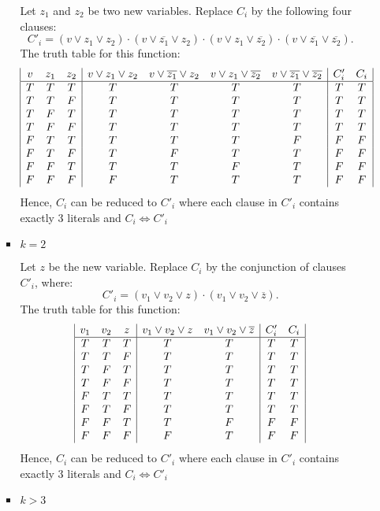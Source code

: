 \documentclass{homework}
\begin{document}
\begin{enumerate}[label=(\alph*)]
\begin{enumerate}[label = \arabic*.]
\begin{itemize}
		Let $z_1$ and $z_2$ be two new variables. Replace $C_i$ by the following four clauses:
		\[C'_i = (v\lor z_1\lor z_2)\cdot(v\lor \overline{z_1}\lor z_2)\cdot(v\lor z_1\lor \overline{z_2})\cdot(v\lor \overline{z_1}\lor \overline{z_2}). \]
		The truth table for this function:
		\begin{displaymath}
		\begin{array}{|c c c|c c c c|c c|}
		v & z_1 & z_2 & v\lor z_1\lor z_2 & v\lor \overline{z_1}\lor z_2 & v\lor z_1\lor \overline{z_2} &v\lor \overline{z_1}\lor \overline{z_2} & C'_i & C_i \\
		\hline
		T & T & T & T & T & T & T & T & T\\
		T & T & F & T & T & T & T & T & T\\
		T & F & T & T & T & T & T & T & T\\
		T & F & F & T & T & T & T & T & T\\
		F & T & T & T & T & T & F & F & F\\
		F & T & F & T & F & T & T & F & F\\
		F & F & T & T & T & F & T & F & F\\
		F & F & F & F & T & T & T & F & F\\
		\end{array}
		\end{displaymath}
		Hence, $C_i$ can be reduced to $C'_i$ where each clause in $C'_i$ contains exactly 3 literals and $C_i \Longleftrightarrow C'_i$
		\item $k=2$

		Let $z$ be the new variable. Replace $C_i$ by the conjunction of clauses $C'_i$, where: \[C'_i = (v_1\lor v_2\lor z)\cdot(v_1\lor v_2\lor \overline{z}).\]
		The truth table for this function:
		\begin{displaymath}
		\begin{array}{|c c c|c c|c c|}
		v_1 & v_2 & z & v_1\lor v_2\lor z & v_1\lor v_2\lor \overline{z} &  C'_i & C_i \\
		\hline
		T & T & T & T & T & T & T\\
		T & T & F & T & T & T & T\\
		T & F & T & T & T & T & T\\
		T & F & F & T & T & T & T\\
		F & T & T & T & T & T & T\\
		F & T & F & T & T & T & T\\
		F & F & T & T & F & F & F\\
		F & F & F & F & T & F & F\\
		\end{array}
		\end{displaymath}
		Hence, $C_i$ can be reduced to $C'_i$ where each clause in $C'_i$ contains exactly 3 literals and $C_i \Longleftrightarrow C'_i$
		\item $k>3$
		

\end{itemize}
\end{enumerate}
\end{enumerate}
\end{document}
